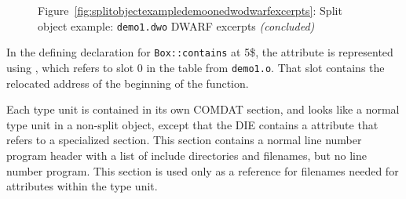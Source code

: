 \begin{figure}
\begin{center}
\vspace{3mm}
Figure~\ref{fig:splitobjectexampledemoonedwodwarfexcerpts}: Split object example: \texttt{demo1.dwo} DWARF excerpts \textit{(concluded)}
\end{center}
\end{figure}

In the defining declaration for \texttt{Box::contains} at 5\$, the
\DWATlowpc{} attribute is represented using \DWFORMaddrx, which refers 
to slot 0 in the \dotdebugaddr{} table from \texttt{demo1.o}.
That slot contains the relocated address of the beginning of the
function.

Each type unit is contained in its own COMDAT \dotdebuginfodwo{}
section, and looks like a normal type unit in a non-split object,
except that the \DWTAGtypeunit{} DIE contains a \DWATstmtlist{}
attribute that refers to a specialized \dotdebuglinedwo{}
section. This
section contains a normal line number
program header with a list of include directories and filenames,
but no line number program. This section is used only as a
reference for filenames needed for \DWATdeclfile{} attributes
within the type unit.

